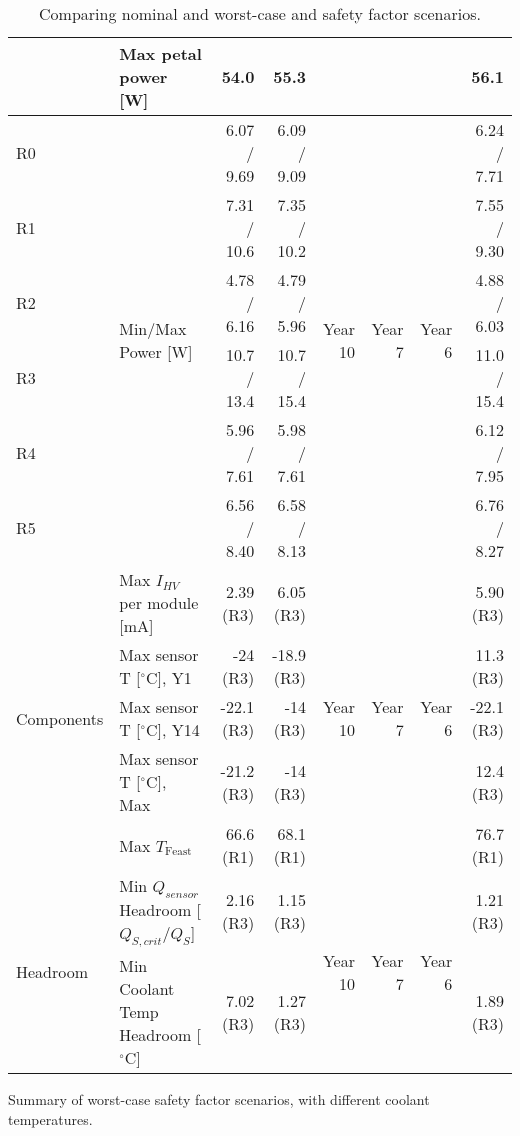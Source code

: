\begin{table}[ht]
\begin{subtable}[t]{.99\linewidth}
\begin{centering}
{\begin{tabular}{|l|l|r|r|r|r|r|r|}
                                & Max petal power [W]                          &          54.0 &         55.3 &  & &  &          56.1 \\ \hline
R0                              & \multirow{6}{*}{Min/Max Power [W]}           &   6.07 / 9.69 &  6.09 / 9.09 &\multirow{6}{*}{Year 10}&\multirow{6}{*}{Year  7}&\multirow{6}{*}{Year  6}& 6.24 / 7.71 \\ 
R1                              &                                              &   7.31 / 10.6 &  7.35 / 10.2 &  & &  &   7.55 / 9.30 \\ 
R2                              &                                              &   4.78 / 6.16 &  4.79 / 5.96 &  & &  &   4.88 / 6.03 \\ 
R3                              &                                              &   10.7 / 13.4 &  10.7 / 15.4 &  & &  &   11.0 / 15.4 \\ 
R4                              &                                              &   5.96 / 7.61 &  5.98 / 7.61 &  & &  &   6.12 / 7.95 \\ 
R5                              &                                              &   6.56 / 8.40 &  6.58 / 8.13 &  & &  &   6.76 / 8.27 \\ \hline
\multirow{5}{*}{Components}     & Max $I_{HV}$ per module [mA]                 &     2.39 (R3) &    6.05 (R3) &\multirow{5}{*}{Year 10}&\multirow{5}{*}{Year  7}&\multirow{5}{*}{Year  6}&     5.90 (R3) \\ 
                                & Max sensor T [$^\circ$C], Y1                 &      -24 (R3) &   -18.9 (R3) &  & &  &     11.3 (R3) \\ 
                                & Max sensor T [$^\circ$C], Y14                &    -22.1 (R3) &     -14 (R3) &  & &  &    -22.1 (R3) \\ 
                                & Max sensor T [$^\circ$C], Max                &    -21.2 (R3) &     -14 (R3) &  & &  &     12.4 (R3) \\ 
                                & Max $T_\text{Feast}$                         &     66.6 (R1) &    68.1 (R1) &  & &  &     76.7 (R1) \\ \hline
\multirow{2}{*}{Headroom}       & Min $Q_{sensor}$ Headroom [$Q_{S,crit}/Q_{S}$] &   2.16 (R3) &    1.15 (R3) & \multirow{2}{*}{Year 10}&\multirow{2}{*}{Year  7}&\multirow{2}{*}{Year  6}&     1.21 (R3) \\ 
                                & Min Coolant Temp Headroom [$^\circ$C]        &     7.02 (R3) &    1.27 (R3) &  & &  &     1.89 (R3) \\ 
\hline\end{tabular}
} %
\end{centering}
\caption{Summary of worst-case safety factor scenarios, with different coolant temperatures.}
\end{subtable}
\caption{Comparing nominal and worst-case and safety factor scenarios.}
\label{results_summary}
\end{table}
\let\arraystretch\arraystretcha

